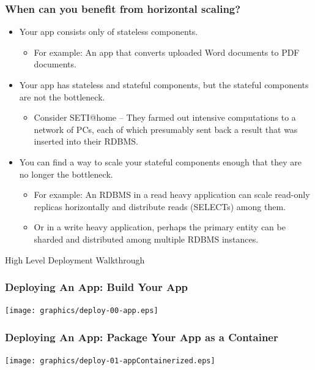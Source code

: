     \begin{frame}
        \frametitle{When can you benefit from horizontal scaling?}
        \begin{itemize}
            \item{Your app consists only of stateless components.}\pause
            \begin{itemize}
                \item{For example: An app that converts uploaded Word documents to PDF documents.}\pause
            \end{itemize}
            \item{Your app has stateless and stateful components, but the stateful components are not the bottleneck.}\pause
            \begin{itemize}
                \item{Consider SETI@home -- They farmed out intensive computations to a network of PCs, each of which presumably sent back a result that was inserted into their RDBMS.}\pause
            \end{itemize}
            \item{You can find a way to scale your stateful components enough that they are no longer the bottleneck.}\pause
            \begin{itemize}
                \item{For example: An RDBMS in a read heavy application can scale read-only replicas horizontally and distribute reads (SELECTs) among them.}\pause
                \item{Or in a write heavy application, perhaps the primary entity can be sharded and distributed among multiple RDBMS instances.}
            \end{itemize}
        \end{itemize}
    \end{frame}

    \begin{frame}
        \begin{center}
            \Huge High Level Deployment Walkthrough
        \end{center}
    \end{frame}

    \begin{frame}
        \frametitle{Deploying An App: Build Your App}
        \texttt{[image: graphics/deploy-00-app.eps]}
    \end{frame}

    \begin{frame}
        \frametitle{Deploying An App: Package Your App as a Container}
        \texttt{[image: graphics/deploy-01-appContainerized.eps]}
    \end{frame}

